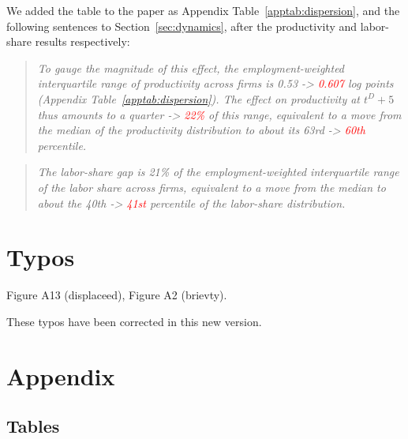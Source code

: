 \documentclass[11pt]{article}
\newcommand{\answer}[1]{\begingroup\color{navy}#1\endgroup}
\begin{document}
\begin{enumerate}[leftmargin=*]
{We added the table to the paper as Appendix Table~\ref{apptab:dispersion}, and the following sentences to Section~\ref{sec:dynamics}, after the productivity and labor-share results respectively:
\begin{quote}\itshape
To gauge the magnitude of this effect, the employment-weighted interquartile range of productivity across firms is 0.53 -> \textcolor{red}{0.607} log points (Appendix Table~\ref{apptab:dispersion}). The effect on productivity at $t^D+5$ thus amounts to a quarter -> \textcolor{red}{22\%} of this range, equivalent to a move from the median of the productivity distribution to about its 63rd -> \textcolor{red}{60th} percentile.
\end{quote}
\begin{quote}\itshape
The labor-share gap is 21\% of the employment-weighted interquartile range of the labor share across firms, equivalent to a move from the median to about the 40th -> \textcolor{red}{41st} percentile of the labor-share distribution.
\end{quote}
}\par


\end{enumerate}

\section*{Typos}

Figure A13 (displaceed), Figure A2 (brievty).\\
\par

\answer{These typos have been corrected in this new version.}



%


\clearpage
\appendix
\setcounter{table}{0}
\setcounter{figure}{0}
\renewcommand{\thetable}{R\arabic{table}}
\renewcommand{\thefigure}{R\arabic{figure}}

\section*{Appendix}

\subsection*{Tables}
\end{document}
